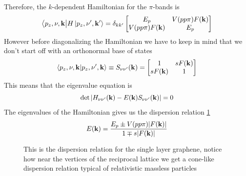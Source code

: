 Therefore, the $k$-dependent Hamiltonian for the $\pi$-bands is 
\begin{equation}
    \big\langle p_z,\nu,\mathbf{k}\big|H\ket{p_z,\nu',\mathbf{k}'}=\delta_{kk'}
    \begin{bmatrix}
        E_p & V(pp\pi)F(\mathbf{k})\\
        V(pp\pi)F(\mathbf{k}) & E_p
    \end{bmatrix}
\end{equation}
However before diagonalizing the Hamiltonian we have to keep in mind that we don't start off with an orthonormal base of states
\begin{equation}
    \braket{p_z,\nu,\mathbf{k}}{p_z,\nu',\mathbf{k}}\equiv S_{\nu\nu'}(\mathbf{k})=
    \begin{bmatrix}
        1 & sF(\mathbf{k})\\
        sF(\mathbf{k})& 1
    \end{bmatrix}
    \label{eq:overlap}
\end{equation}
This means that the eigenvalue equation is
\begin{equation}
    \det \left|H_{\nu\nu'}(\mathbf{k})-E(\mathbf{k})S_{\nu\nu'}(\mathbf{k})\right|=0
\end{equation}
The eigenvalues of the Hamiltonian gives us the dispersion relation \ref{fig:graphenedispersion}
\begin{equation}
    E(\mathbf{k})=\frac{E_p\pm V(pp\pi)|F(\mathbf{k})|}{1\mp s|F(\mathbf{k})|}
\end{equation}
\begin{figure}[h]
    \caption{This is the dispersion relation for the single layer graphene, notice how near the vertices of the reciprocal lattice we get a cone-like dispersion relation typical of relativistic massless particles \cite{guinea2008review}}
    \label{fig:graphenedispersion}
\end{figure}
